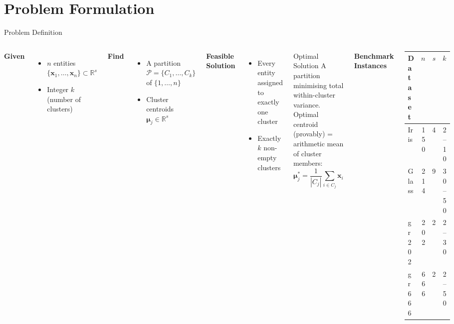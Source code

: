 \documentclass[aspectratio=169,12pt]{beamer}
\begin{document}
\section{Problem Formulation}

\begin{frame}{Problem Definition}
  \begin{columns}[T]
      \textbf{Given}
      \begin{itemize}
        \item $n$ entities $\{\mathbf{x}_1,\ldots,\mathbf{x}_n\} \subset \mathbb{R}^s$
        \item Integer $k$ (number of clusters)
      \end{itemize}

      \vspace{0.3em}
      \textbf{Find}
      \begin{itemize}
        \item A partition $\mathcal{P} = \{C_1,\ldots,C_k\}$ of $\{1,\ldots,n\}$
        \item Cluster centroids $\boldsymbol{\mu}_j \in \mathbb{R}^s$
      \end{itemize}

      \vspace{0.3em}
      \textbf{Feasible Solution}
      \begin{itemize}
        \item Every entity assigned to exactly one cluster
        \item Exactly $k$ non-empty clusters
      \end{itemize}

      \begin{block}{Optimal Solution}
        A partition minimising total within-cluster variance.
        Optimal centroid (provably) = arithmetic mean of cluster members:
        \[
          \boldsymbol{\mu}_j^* = \frac{1}{|C_j|}\sum_{i \in C_j}\mathbf{x}_i
        \]
      \end{block}

      \vspace{0.3em}
      \textbf{Benchmark Instances}
      \begin{center}
      \small
      \begin{tabular}{lrrr}
        \toprule
        Dataset & $n$ & $s$ & $k$ \\
        \midrule
        Iris & 150 & 4 & 2--10 \\
        Glass & 214 & 9 & 30--50 \\
        gr202 & 202 & 2 & 2--30 \\
        gr666 & 666 & 2 & 2--50 \\
        \bottomrule
      \end{tabular}
      \end{center}
  \end{columns}
\end{frame}
\end{document}
